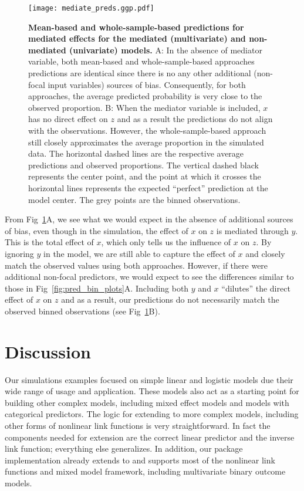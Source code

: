 \begin{figure}
\begin{center}
\texttt{[image: mediate\_preds.ggp.pdf]}
\end{center}
\caption{{\bf Mean-based and whole-sample-based predictions for mediated effects for the mediated (multivariate) and non-mediated (univariate) models.} A: In the absence of mediator variable, both mean-based and whole-sample-based approaches predictions are identical since there is no any other additional (non-focal input variables) sources of bias. Consequently, for both approaches, the average predicted probability is very close to the observed proportion. B: When the mediator variable is included,  $x$ has no direct effect on $z$ and as a result the predictions do not align with the observations. However, the whole-sample-based approach still closely approximates the average proportion in the simulated data. The horizontal dashed lines are the respective average predictions and observed proportions. The vertical dashed black represents the center point, and the point at which it crosses the horizontal lines represents the expected ``perfect'' prediction at the model center. The grey points are the binned observations.}
\label{fig:pred_mediated_plots}
\end{figure}

From Fig~\ref{fig:pred_mediated_plots}A, we see what we would expect in the absence of additional sources of bias, even though in the simulation, the effect of $x$ on $z$ is mediated through $y$. This is the total effect of $x$, which only tells us the influence of $x$ on $z$. By ignoring $y$ in the model, we are still able to capture the effect of $x$ and closely match the observed values using both approaches. However, if there were additional non-focal predictors, we would expect to see the differences similar to those in Fig~\ref{fig:pred_bin_plots}A. Including both $y$ and $x$ ``dilutes'' the direct effect of $x$ on $z$ and as a result, our predictions do not necessarily match the observed binned observations (see Fig~\ref{fig:pred_mediated_plots}B).

\section{Discussion}

Our simulations examples focused on simple linear and logistic models due their wide range of usage and application. These models also act as a starting point for building other complex models, including mixed effect models and models with categorical predictors. The logic for extending to more complex models, including other forms of nonlinear link functions is very straightforward. In fact the components needed for extension are the correct linear predictor and the inverse link function; everything else generalizes. In addition, our  package implementation already extends to and supports most of the nonlinear link functions and mixed model framework, including multivariate binary outcome models.

